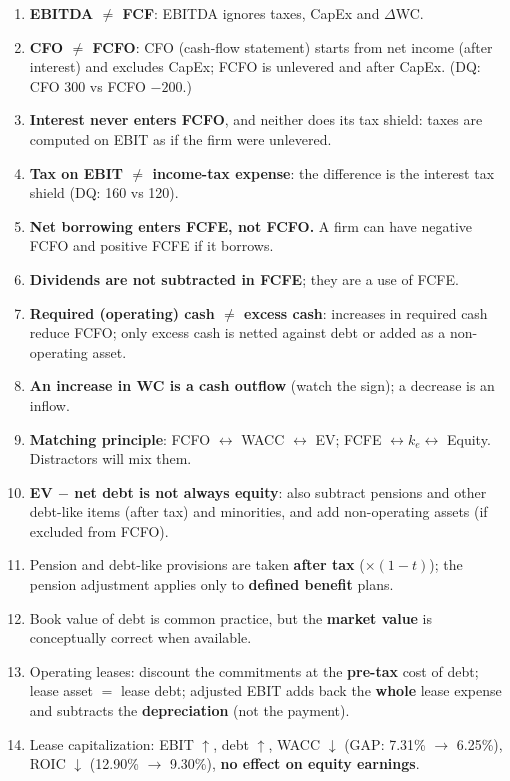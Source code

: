 \begin{trapbox}
\begin{enumerate}[leftmargin=*]
  \item \textbf{EBITDA $\neq$ FCF}: EBITDA ignores taxes, CapEx and $\Delta$WC.
  \item \textbf{CFO $\neq$ FCFO}: CFO (cash-flow statement) starts from net income (after interest) and excludes CapEx; FCFO is unlevered and after CapEx. (DQ: CFO 300 vs FCFO $-200$.)
  \item \textbf{Interest never enters FCFO}, and neither does its tax shield: taxes are computed on EBIT as if the firm were unlevered.
  \item \textbf{Tax on EBIT $\neq$ income-tax expense}: the difference is the interest tax shield (DQ: 160 vs 120).
  \item \textbf{Net borrowing enters FCFE, not FCFO.} A firm can have negative FCFO and positive FCFE if it borrows.
  \item \textbf{Dividends are not subtracted in FCFE}; they are a use of FCFE.
  \item \textbf{Required (operating) cash $\neq$ excess cash}: increases in required cash reduce FCFO; only excess cash is netted against debt or added as a non-operating asset.
  \item \textbf{An increase in WC is a cash outflow} (watch the sign); a decrease is an inflow.
  \item \textbf{Matching principle}: FCFO $\leftrightarrow$ WACC $\leftrightarrow$ EV; FCFE $\leftrightarrow k_e \leftrightarrow$ Equity. Distractors will mix them.
  \item \textbf{EV $-$ net debt is not always equity}: also subtract pensions and other debt-like items (after tax) and minorities, and add non-operating assets (if excluded from FCFO).
  \item Pension and debt-like provisions are taken \textbf{after tax} ($\times(1-t)$); the pension adjustment applies only to \textbf{defined benefit} plans.
  \item Book value of debt is common practice, but the \textbf{market value} is conceptually correct when available.
  \item Operating leases: discount the commitments at the \textbf{pre-tax} cost of debt; lease asset $=$ lease debt; adjusted EBIT adds back the \textbf{whole} lease expense and subtracts the \textbf{depreciation} (not the payment).
  \item Lease capitalization: EBIT $\uparrow$, debt $\uparrow$, WACC $\downarrow$ (GAP: 7.31\% $\to$ 6.25\%), ROIC $\downarrow$ (12.90\% $\to$ 9.30\%), \textbf{no effect on equity earnings}.

\end{enumerate}
\end{trapbox}
